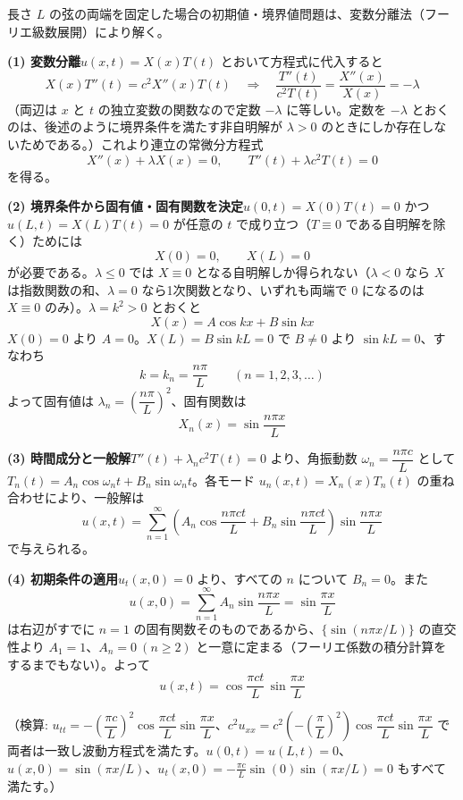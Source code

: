 
長さ $L$ の弦の両端を固定した場合の初期値・境界値問題は、変数分離法（フーリエ級数展開）により解く。

\medskip
\noindent
\textbf{(1) 変数分離}\quad $u(x,t) = X(x)T(t)$ とおいて方程式に代入すると
\[
X(x)T''(t) = c^{2}X''(x)T(t)
\quad\Longrightarrow\quad
\frac{T''(t)}{c^{2}T(t)} = \frac{X''(x)}{X(x)} = -\lambda
\]
（両辺は $x$ と $t$ の独立変数の関数なので定数 $-\lambda$ に等しい。定数を $-\lambda$ とおくのは、後述のように境界条件を満たす非自明解が $\lambda > 0$ のときにしか存在しないためである。）これより連立の常微分方程式
\[
X''(x) + \lambda X(x) = 0, \qquad T''(t) + \lambda c^{2} T(t) = 0
\]
を得る。

\medskip
\noindent
\textbf{(2) 境界条件から固有値・固有関数を決定}\quad $u(0,t) = X(0)T(t) = 0$ かつ $u(L,t) = X(L)T(t) = 0$ が任意の $t$ で成り立つ（$T \equiv 0$ である自明解を除く）ためには
\[
X(0) = 0, \qquad X(L) = 0
\]
が必要である。$\lambda \le 0$ では $X \equiv 0$ となる自明解しか得られない（$\lambda<0$ なら $X$ は指数関数の和、$\lambda=0$ なら1次関数となり、いずれも両端で $0$ になるのは $X\equiv0$ のみ）。$\lambda = k^{2} > 0$ とおくと
\[
X(x) = A\cos kx + B\sin kx
\]
$X(0)=0$ より $A=0$。$X(L)=B\sin kL = 0$ で $B \neq 0$ より $\sin kL = 0$、すなわち
\[
k = k_{n} = \frac{n\pi}{L} \qquad (n = 1,2,3,\dots)
\]
よって固有値は $\lambda_{n} = \left(\dfrac{n\pi}{L}\right)^{2}$、固有関数は
\[
X_{n}(x) = \sin\frac{n\pi x}{L}
\]

\medskip
\noindent
\textbf{(3) 時間成分と一般解}\quad $T''(t) + \lambda_{n}c^{2}T(t) = 0$ より、角振動数 $\omega_{n} = \dfrac{n\pi c}{L}$ として $T_{n}(t) = A_{n}\cos\omega_{n}t + B_{n}\sin\omega_{n}t$。各モード $u_{n}(x,t) = X_{n}(x)T_{n}(t)$ の重ね合わせにより、一般解は
\[
u(x,t) = \sum_{n=1}^{\infty}\left(A_{n}\cos\frac{n\pi c t}{L} + B_{n}\sin\frac{n\pi c t}{L}\right)\sin\frac{n\pi x}{L}
\]
で与えられる。

\medskip
\noindent
\textbf{(4) 初期条件の適用}\quad $u_{t}(x,0) = 0$ より、すべての $n$ について $B_{n} = 0$。また
\[
u(x,0) = \sum_{n=1}^{\infty} A_{n}\sin\frac{n\pi x}{L} = \sin\frac{\pi x}{L}
\]
は右辺がすでに $n=1$ の固有関数そのものであるから、$\{\sin(n\pi x/L)\}$ の直交性より $A_{1} = 1$、$A_{n} = 0\ (n \ge 2)$ と一意に定まる（フーリエ係数の積分計算をするまでもない）。よって
\[
\boxed{\; u(x,t) = \cos\frac{\pi c t}{L}\,\sin\frac{\pi x}{L} \;}
\]

（検算: $u_{tt} = -\left(\dfrac{\pi c}{L}\right)^{2}\cos\dfrac{\pi ct}{L}\sin\dfrac{\pi x}{L}$、$c^{2}u_{xx} = c^{2}\left(-\left(\dfrac{\pi}{L}\right)^{2}\right)\cos\dfrac{\pi ct}{L}\sin\dfrac{\pi x}{L}$ で両者は一致し波動方程式を満たす。$u(0,t)=u(L,t)=0$、$u(x,0)=\sin(\pi x/L)$、$u_t(x,0) = -\frac{\pi c}{L}\sin(0)\sin(\pi x/L)=0$ もすべて満たす。）
